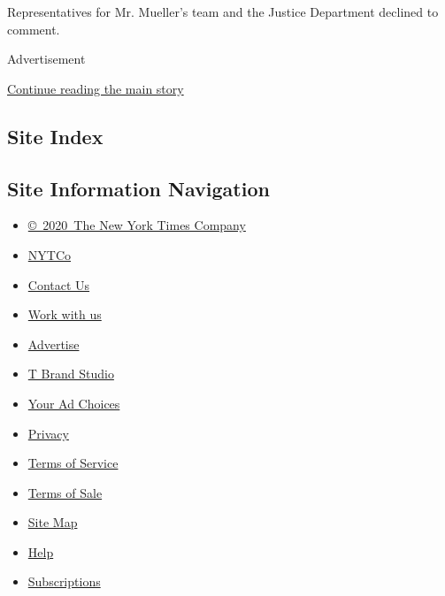 Representatives for Mr. Mueller's team and the Justice Department
declined to comment.

Advertisement

\protect\hyperlink{after-bottom}{Continue reading the main story}

\hypertarget{site-index}{%
\subsection{Site Index}\label{site-index}}

\hypertarget{site-information-navigation}{%
\subsection{Site Information
Navigation}\label{site-information-navigation}}

\begin{itemize}
\tightlist
\item
  \href{https://help.nytimes.com/hc/en-us/articles/115014792127-Copyright-notice}{©~2020~The
  New York Times Company}
\end{itemize}

\begin{itemize}
\tightlist
\item
  \href{https://www.nytco.com/}{NYTCo}
\item
  \href{https://help.nytimes.com/hc/en-us/articles/115015385887-Contact-Us}{Contact
  Us}
\item
  \href{https://www.nytco.com/careers/}{Work with us}
\item
  \href{https://nytmediakit.com/}{Advertise}
\item
  \href{http://www.tbrandstudio.com/}{T Brand Studio}
\item
  \href{https://www.nytimes.com/privacy/cookie-policy\#how-do-i-manage-trackers}{Your
  Ad Choices}
\item
  \href{https://www.nytimes.com/privacy}{Privacy}
\item
  \href{https://help.nytimes.com/hc/en-us/articles/115014893428-Terms-of-service}{Terms
  of Service}
\item
  \href{https://help.nytimes.com/hc/en-us/articles/115014893968-Terms-of-sale}{Terms
  of Sale}
\item
  \href{https://spiderbites.nytimes.com}{Site Map}
\item
  \href{https://help.nytimes.com/hc/en-us}{Help}
\item
  \href{https://www.nytimes.com/subscription?campaignId=37WXW}{Subscriptions}
\end{itemize}
